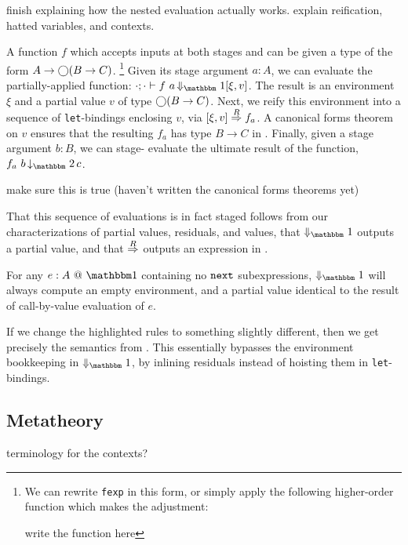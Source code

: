 \TODO finish explaining how the nested evaluation actually works.
explain reification, hatted variables, and contexts.

A function $f$ which accepts inputs at both stages \bbone{} and \bbtwo{} can be
given a type of the form $A\to\bigcirc(B\to C)$.%
\footnote{We can rewrite \texttt{fexp} in this form, or simply apply the following
higher-order function which makes the adjustment:

\TODO write the function here}
Given its stage \bbone{} argument $a:A$, we can evaluate the partially-applied
function:
$\cdot;\cdot\vdash f~a \mathop{\redonesym} [\xi,v]$.
The result is an environment $\xi$ and a partial value $v$ of type $\bigcirc(B\to
C)$. Next, we reify this environment into a sequence of \verb|let|-bindings
enclosing $v$, via $[{\xi},{v}]\overset{R}\Rightarrow{f_a}$. A canonical forms theorem on $v$
ensures that the resulting $f_a$ has type $B\to C$ in \langTwo.
Finally, given a stage \bbtwo{} argument $b:B$, we can stage-\bbtwo{} evaluate
the ultimate result of the function, $f_a~b \mathop{\tworedsym} c$.

\TODO make sure this is true (haven't written the canonical forms theorems yet)

That this sequence of evaluations is in fact staged follows from our
characterizations of partial values, residuals, and values, that $\redonesym$
outputs a partial value, and that $\overset{R}\Rightarrow$ outputs an expression in \langTwo.

\begin{remark}
For any $\colone{e}{A}$ containing no ${\tt next}$ subexpressions, $\redonesym$ will
always compute an empty environment, and a partial value identical to the result
of call-by-value evaluation of $e$.
\end{remark}

\TODO 
If we change the highlighted rules to something slightly different, then we get
precisely the semantics from \cite{davies96}. This essentially bypasses the
environment bookkeeping in $\redonesym$, by inlining residuals instead of
hoisting them in \verb|let|-bindings.

\subsection{Metatheory}

\noindent\TODO terminology for the contexts?

\newcommand{\wf}{\ \mathsf{wf}}
\newcommand{\valoo}{\ \bbone\textsf{-}\mathsf{val} @ \bbone}
\newcommand{\valot}{\ \bbone\textsf{-}\mathsf{val} @ \bbtwo}
\newcommand{\valtt}{\ \bbtwo\textsf{-}\mathsf{val} @ \bbtwo}

